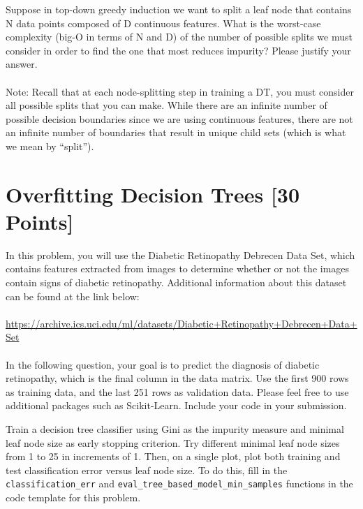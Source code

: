 \problem[4] Suppose in top-down greedy induction we want to split a leaf node that contains
N data points composed of D continuous features. What is the worst-case complexity (big-O in terms of N and D) of the number of possible splits we must consider in order to find the one that most reduces impurity? Please justify your answer.\\
\\
Note: Recall that at each node-splitting step in training a DT, you must consider all possible splits that you can make. While there are an infinite number of possible decision boundaries since we are using continuous features, there are not an infinite number of boundaries that result in unique child sets (which is what we mean by “split”).
\begin{solution}
\end{solution}
\newpage


\section{Overfitting Decision Trees [30 Points]}

In this problem, you will use the Diabetic Retinopathy Debrecen Data Set, which contains features extracted from images to determine whether or not the images contain signs of diabetic retinopathy. Additional information about this dataset can be found at the link below:\\
\\
\url{https://archive.ics.uci.edu/ml/datasets/Diabetic+Retinopathy+Debrecen+Data+Set}\\
\\
In the following question, your goal is to predict the diagnosis of diabetic retinopathy, which is the final column in the data matrix. Use the first 900 rows as training data, and the last 251 rows as validation data. Please feel free to use additional packages such as Scikit-Learn. Include your code in your submission.

\indent\problem[7] %
Train a decision tree classifier using Gini as the impurity measure and minimal leaf
node size as early stopping criterion. Try different minimal leaf node sizes from 1 to 25 in increments of 1. Then, on a single plot, plot both training and test classification error versus leaf node size. To do this, fill in the \texttt{classification_err} and \texttt{eval_tree_based_model_min_samples} functions in the code template for this problem.
\begin{solution}
\end{solution}
\newpage


